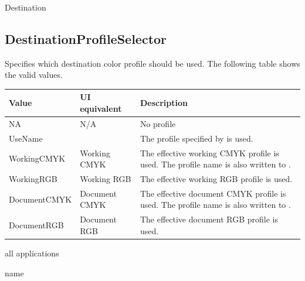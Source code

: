 \documentclass[letterpaper,12pt,english,openany,oneside]{sphinxmanual}
\begin{document}
\label{\detokenize{PDF_Create_NewNamespaces:ui-name-7}}

Destination




\subsection{DestinationProfileSelector}
\label{\detokenize{PDF_Create_NewNamespaces:destinationprofileselector}}
Specifies which destination color profile should be used. The following table shows the valid values.


\begin{savenotes}\sphinxattablestart
\centering
{}\label{\detokenize{PDF_Create_NewNamespaces:section-1}}\nobreak
\begin{tabulary}{\linewidth}[t]{|T|T|T|}
\hline
\sphinxstyletheadfamily 
Value
&\sphinxstyletheadfamily 
UI equivalent
&\sphinxstyletheadfamily 
Description
\\
\hline
NA
&
N/A
&
No profile
\\
\hline
UseName
&
&
The profile specified by  is used.
\\
\hline
WorkingCMYK
&
Working CMYK
&
The effective working CMYK profile is used. The profile name is also written to  .
\\
\hline
WorkingRGB
&
Working RGB
&
The effective working RGB profile is used.
\\
\hline
DocumentCMYK
&
Document CMYK
&
The effective document CMYK profile is used. The profile name is also written to  .
\\
\hline
DocumentRGB
&
Document RGB
&
The effective document RGB profile is used.
\\
\hline
\end{tabulary}
\par
\sphinxattableend\end{savenotes}
\label{\detokenize{PDF_Create_NewNamespaces:supported-by-8}}

all applications

\label{\detokenize{PDF_Create_NewNamespaces:type-8}}

name

\label{\detokenize{PDF_Create_NewNamespaces:ui-name-8}}
\end{document}
